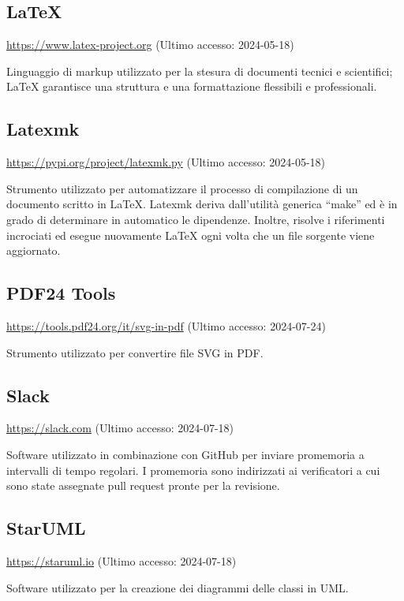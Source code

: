 \subsection{LaTeX}
\par \href{https://www.latex-project.org}{https://www.latex-project.org} (Ultimo accesso: 2024-05-18)
\par Linguaggio di markup utilizzato per la stesura di documenti tecnici e scientifici; LaTeX garantisce una struttura e una formattazione flessibili e professionali.
    
\subsection{Latexmk}
\par \href{https://pypi.org/project/latexmk.py/}{https://pypi.org/project/latexmk.py} (Ultimo accesso: 2024-05-18)
\par Strumento utilizzato per automatizzare il processo di compilazione di un documento scritto in LaTeX. Latexmk deriva dall'utilità generica “make” ed è in grado di determinare in automatico le dipendenze. Inoltre, risolve i riferimenti incrociati ed esegue nuovamente LaTeX ogni volta che un file sorgente viene aggiornato.

\subsection{PDF24 Tools}
\par \href{https://tools.pdf24.org/it/svg-in-pdf}{https://tools.pdf24.org/it/svg-in-pdf} (Ultimo accesso: 2024-07-24)
\par Strumento utilizzato per convertire file SVG in PDF.

\subsection{Slack}
\par \href{https://slack.com}{https://slack.com} (Ultimo accesso: 2024-07-18)
\par Software utilizzato in combinazione con GitHub per inviare promemoria a intervalli di tempo regolari. I promemoria sono indirizzati ai verificatori a cui sono state assegnate pull request pronte per la revisione.

\subsection{StarUML}
\par \href{https://staruml.io}{https://staruml.io} (Ultimo accesso: 2024-07-18)
\par Software utilizzato per la creazione dei diagrammi delle classi in UML.

